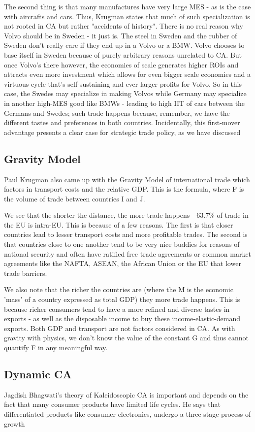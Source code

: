 The second thing is that many manufactures have very large MES - as is the case with aircrafts and cars. Thus, Krugman states that much of such specialization is not rooted in CA but rather "accidents of history". There is no real reason why Volvo should be in Sweden - it just is. The steel in Sweden and the rubber of Sweden don't really care if they end up in a Volvo or a BMW. Volvo chooses to base itself in Sweden because of purely arbitrary reasons unrelated to CA. But once Volvo's there however, the economies of scale generates higher ROIs and attracts even more investment which allows for even bigger scale economies and a virtuous cycle that's self-sustaining and ever larger profits for Volvo. So in this case, the Swedes may specialize in making Volvos while Germany may specialize in another high-MES good like BMWs - leading to high IIT of cars between the Germans and Swedes; such trade happens because, remember, we have the different tastes and preferences in both countries. Incidentally, this first-mover advantage presents a clear case for strategic trade policy, as we have discussed
\subsection{Gravity Model}
Paul Krugman also came up with the Gravity Model of international trade which factors in transport costs and the relative GDP. This is the formula, where F is the volume of trade between countries I and J.

We see that the shorter the distance, the more trade happens - 63.7\% of trade in the EU is intra-EU. This is because of a few reasons. The first is that closer countries lead to lesser transport costs and more profitable trades. The second is that countries close to one another tend to be very nice buddies for reasons of national security and often have ratified free trade agreements or common market agreements like the NAFTA, ASEAN, the African Union or the EU that lower trade barriers.

We also note that the richer the countries are (where the M is the economic 'mass' of a country expressed as total GDP) they more trade happens. This is because richer consumers tend to have a more refined and diverse tastes in exports - as well as the disposable income to buy these income-elastic-demand exports. Both GDP and transport are not factors considered in CA.
As with gravity with physics, we don't know the value of the constant G and thus cannot quantify F in any meaningful way.
\subsection{Dynamic CA}
Jagdish Bhagwati's theory of Kaleidoscopic CA is important and depends on the fact that many consumer products have limited life cycles. He says that differentiated products like consumer electronics, undergo a three-stage process of growth

